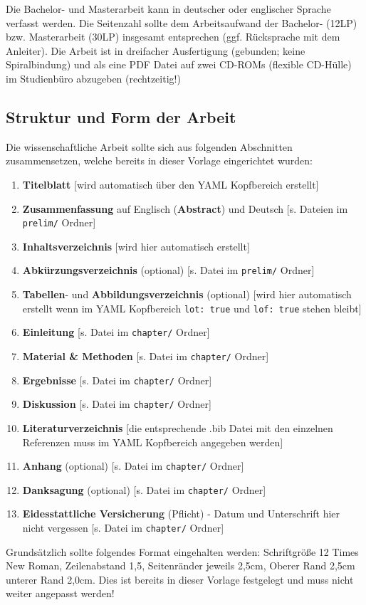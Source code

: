 \documentclass[a4paper,12pt]{article}
\providecommand{\tightlist}{%
  \setlength{\itemsep}{0pt}\setlength{\parskip}{0pt}}
\begin{document}
Die Bachelor- und Masterarbeit kann in deutscher oder englischer Sprache verfasst werden. Die Seitenzahl sollte dem Arbeitsaufwand der Bachelor- (12LP) bzw. Masterarbeit (30LP) insgesamt entsprechen (ggf. Rücksprache mit dem Anleiter). Die Arbeit ist in dreifacher Ausfertigung (gebunden; keine Spiralbindung) und als eine PDF Datei auf zwei CD-ROMs (flexible CD-Hülle) im Studienbüro abzugeben (rechtzeitig!)

\hypertarget{struktur-und-form-der-arbeit}{%
\subsection{Struktur und Form der Arbeit}\label{struktur-und-form-der-arbeit}}

Die wissenschaftliche Arbeit sollte sich aus folgenden Abschnitten zusammensetzen, welche bereits in dieser Vorlage eingerichtet wurden:
\begin{enumerate}
\def\labelenumi{\arabic{enumi}.}
\tightlist
\item
  \textbf{Titelblatt} {[}wird automatisch über den YAML Kopfbereich erstellt{]}
\item
  \textbf{Zusammenfassung} auf Englisch (\textbf{Abstract}) und Deutsch {[}s. Dateien im \texttt{prelim/} Ordner{]}
\item
  \textbf{Inhaltsverzeichnis} {[}wird hier automatisch erstellt{]}
\item
  \textbf{Abkürzungsverzeichnis} (optional) {[}s. Datei im \texttt{prelim/} Ordner{]}
\item
  \textbf{Tabellen}- und \textbf{Abbildungsverzeichnis} (optional) {[}wird hier automatisch erstellt wenn im YAML Kopfbereich \texttt{lot:\ true} und \texttt{lof:\ true} stehen bleibt{]}
\item
  \textbf{Einleitung} {[}s. Datei im \texttt{chapter/} Ordner{]}
\item
  \textbf{Material \& Methoden} {[}s. Datei im \texttt{chapter/} Ordner{]}
\item
  \textbf{Ergebnisse} {[}s. Datei im \texttt{chapter/} Ordner{]}
\item
  \textbf{Diskussion} {[}s. Datei im \texttt{chapter/} Ordner{]}
\item
  \textbf{Literaturverzeichnis} {[}die entsprechende .bib Datei mit den einzelnen Referenzen muss im YAML Kopfbereich angegeben werden{]}
\item
  \textbf{Anhang} (optional) {[}s. Datei im \texttt{chapter/} Ordner{]}
\item
  \textbf{Danksagung} (optional) {[}s. Datei im \texttt{chapter/} Ordner{]}
\item
  \textbf{Eidesstattliche Versicherung} (Pflicht) - Datum und Unterschrift hier nicht vergessen {[}s. Datei im \texttt{chapter/} Ordner{]}
\end{enumerate}
Grundsätzlich sollte folgendes Format eingehalten werden: Schriftgröße 12 Times New Roman, Zeilenabstand 1,5, Seitenränder jeweils 2,5cm, Oberer Rand 2,5cm unterer Rand 2,0cm. Dies ist bereits in dieser Vorlage festgelegt und muss nicht weiter angepasst werden!
\end{document}
